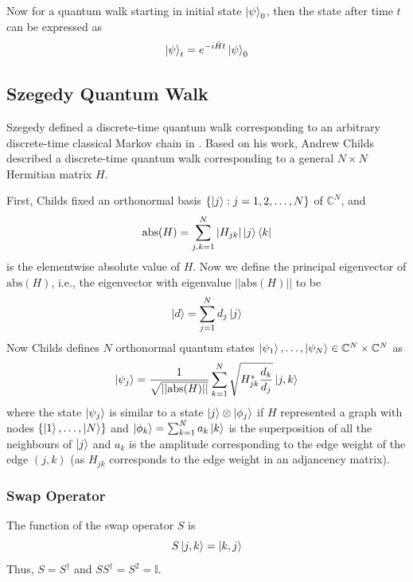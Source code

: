 \documentclass[
10pt, %
a4paper, %
oneside, %
headinclude,footinclude, %
BCOR5mm, %
]{scrartcl}
\begin{document}
Now for a quantum walk starting in initial state $\ket\psi_0$, then the state after time $t$ can be expressed as
$$\ket\psi_t=e^{-i\hat{H}t}\ket\psi_0$$

\subsection{Szegedy Quantum Walk}
Szegedy defined a discrete-time quantum walk corresponding to an arbitrary discrete-time classical Markov chain in \cite{1366222}. Based on his work, Andrew Childs described a discrete-time quantum walk corresponding to a general $N\times N$ Hermitian matrix $H$.\newline

First, Childs fixed an orthonormal basis $\{\ket j:j=1,2,\ldots,N\}$ of $\mathbb{C}^N$, and
$$\text{abs}(H)=\sum_{j,k=1}^N\abs{H_{jk}}\ket j\bra k$$\label{abs_def}
is the elementwise absolute value of $H$. Now we define the principal eigenvector of $\text{abs}(H)$, i.e., the eigenvector with eigenvalue $||\text{abs}(H)||$ to be
$$\ket d=\sum_{j=1}^Nd_j\ket j$$
Now Childs defines $N$ orthonormal quantum states $\ket{\psi_1},\ldots,\ket{\psi_N}\in\mathbb{C}^N\times\mathbb{C}^N$ as
$$\ket{\psi_j}=\frac{1}{\sqrt{||\text{abs}(H)||}}\sum_{k=1}^N\sqrt{H_{jk}^*\frac{d_k}{d_j}}\ket{j,k}$$\label{szegedy_quantum_states}
where the state $\ket{\psi_j}$ is similar to a state $\ket j\otimes\ket{\phi_j}$ if $H$ represented a graph with nodes $\{\ket1,\ldots,\ket N\}$ and $\ket{\phi_k}=\sum_{k=1}^Na_k\ket k$ is the superposition of all the neighbours of $\ket j$ and $a_k$ is the amplitude corresponding to the  edge weight of the edge $(j,k)$ (as $H_{jk}$ corresponds to the edge weight in an adjancency matrix).

\subsubsection{Swap Operator}
The function of the swap operator $S$ is
$$S\ket{j,k}=\ket{k,j}$$
Thus, $S=S^{\dagger}$ and $SS^{\dagger}=S^2=\mathbb{I}$.
\end{document}

